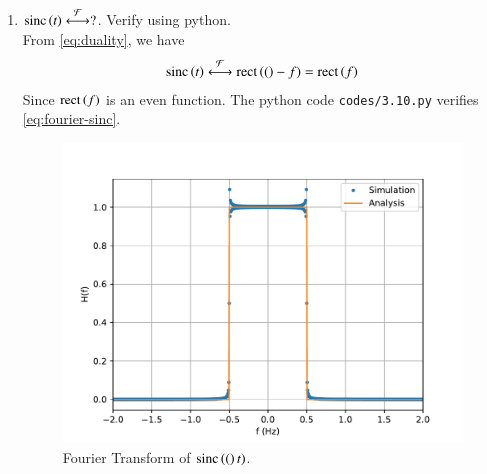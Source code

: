 \documentclass[journal,12pt,twocolumn]{IEEEtran}
\renewcommand\thesection{\arabic{section}}
\begin{document}
\begin{enumerate}[label=\thesection.\arabic*
,ref=\thesection.\theenumi]
\item
$     \text{sinc}\left(t\right)\overset{\mathcal{F}}{ \longleftrightarrow} ?$. Verify using python.\\
\solution From \eqref{eq:duality}, we have
\begin{align}
\text{sinc}\left(t\right)\overset{\mathcal{F}}{ \longleftrightarrow}\text{rect}\left((\right)-f)=\text{rect}\left(f\right)
\label{eq:fourier-sinc}
\end{align}
Since $\text{rect}\left(f\right)$ is an even function.
The python code \texttt{codes/3.10.py} verifies \eqref{eq:fourier-sinc}.
\begin{figure}[!ht]
\includegraphics[width=\columnwidth]{figs/3.10.pdf}
\caption{Fourier Transform of $\text{sinc}\left((\right)t)$.}
\label{eq:fig-fourier-sinc}
\end{figure}
\end{enumerate}
\end{document}
